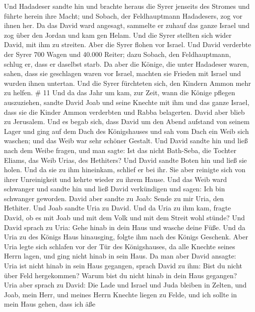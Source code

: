  Und Hadadeser sandte hin und brachte heraus die Syrer
jenseits des Stromes und führte herein ihre Macht; und Sobach, der
Feldhauptmann Hadadesers, zog vor ihnen her.  Da das David
ward angesagt, sammelte er zuhauf das ganze Israel und zog über den
Jordan und kam gen Helam. Und die Syrer stellten sich wider David, mit
ihm zu streiten.  Aber die Syrer flohen vor Israel. Und
David verderbte der Syrer 700 Wagen und 40.000 Reiter; dazu Sobach, den
Feldhauptmann, schlug er, dass er daselbst starb.  Da aber
die Könige, die unter Hadadeser waren, sahen, dass sie geschlagen waren
vor Israel, machten sie Frieden mit Israel und wurden ihnen untertan.
Und die Syrer fürchteten sich, den Kindern Ammon mehr zu helfen. \# 11
 Und da das Jahr um kam, zur Zeit, wann die Könige pflegen
auszuziehen, sandte David Joab und seine Knechte mit ihm und das ganze
Israel, dass sie die Kinder Ammon verderbten und Rabba belagerten. David
aber blieb zu Jerusalem.  Und es begab sich, dass David um
den Abend aufstand von seinem Lager und ging auf dem Dach des
Königshauses und sah vom Dach ein Weib sich waschen; und das Weib war
sehr schöner Gestalt.  Und David sandte hin und ließ nach
dem Weibe fragen, und man sagte: Ist das nicht Bath-Seba, die Tochter
Eliams, das Weib Urias, des Hethiters?  Und David sandte
Boten hin und ließ sie holen. Und da sie zu ihm hineinkam, schlief er
bei ihr. Sie aber reinigte sich von ihrer Unreinigkeit und kehrte wieder
zu ihrem Hause.  Und das Weib ward schwanger und sandte hin
und ließ David verkündigen und sagen: Ich bin schwanger geworden.
 David aber sandte zu Joab: Sende zu mir Uria, den Hethiter.
Und Joab sandte Uria zu David.  Und da Uria zu ihm kam,
fragte David, ob es mit Joab und mit dem Volk und mit dem Streit wohl
stünde?  Und David sprach zu Uria: Gehe hinab in dein Haus
und wasche deine Füße. Und da Uria zu des Königs Haus hinausging, folgte
ihm nach des Königs Geschenk.  Aber Uria legte sich schlafen
vor der Tür des Königshauses, da alle Knechte seines Herrn lagen, und
ging nicht hinab in sein Haus.  Da man aber David ansagte:
Uria ist nicht hinab in sein Haus gegangen, sprach David zu ihm: Bist du
nicht über Feld hergekommen? Warum bist du nicht hinab in dein Haus
gegangen?  Uria aber sprach zu David: Die Lade und Israel
und Juda bleiben in Zelten, und Joab, mein Herr, und meines Herrn
Knechte liegen zu Felde, und ich sollte in mein Haus gehen, dass ich äße
